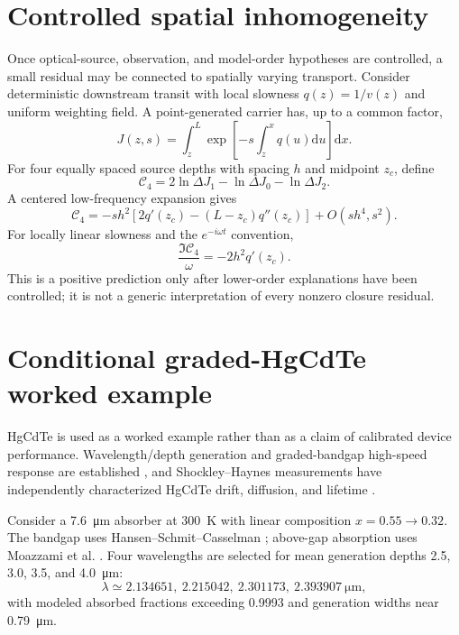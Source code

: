 \documentclass[11pt]{article}
\newcommand{\dd}{\mathrm{d}}
\newcommand{\Cfour}{\mathcal{C}_4}
\begin{document}
\section{Controlled spatial inhomogeneity}
Once optical-source, observation, and model-order hypotheses are controlled, a small residual may be connected to spatially varying transport. Consider deterministic downstream transit with local slowness $q(z)=1/v(z)$ and uniform weighting field. A point-generated carrier has, up to a common factor,
\begin{equation}
J(z,s)=\int_z^L\exp\left[-s\int_z^xq(u)\dd u\right]\dd x.
\end{equation}
For four equally spaced source depths with spacing $h$ and midpoint $z_c$, define
\begin{equation}
\Cfour=2\ln\Delta J_1-\ln\Delta J_0-\ln\Delta J_2.
\end{equation}
A centered low-frequency expansion gives
\begin{equation}
\boxed{\Cfour=-s h^2\left[2q'(z_c)-(L-z_c)q''(z_c)\right]+O(sh^4,s^2).}
\label{eq:gradient}
\end{equation}
For locally linear slowness and the $e^{-i\omega t}$ convention,
\begin{equation}
\boxed{\frac{\Im\Cfour}{\omega}=-2h^2q'(z_c).}
\end{equation}
This is a positive prediction only after lower-order explanations have been controlled; it is not a generic interpretation of every nonzero closure residual.

\section{Conditional graded-HgCdTe worked example}
HgCdTe is used as a worked example rather than as a claim of calibrated device performance. Wavelength/depth generation and graded-bandgap high-speed response are established \cite{Sang2022}, and Shockley--Haynes measurements have independently characterized HgCdTe drift, diffusion, and lifetime \cite{Rothman2010}.

Consider a \SI{7.6}{\micro\meter} absorber at \SI{300}{K} with linear composition $x=0.55\rightarrow0.32$. The bandgap uses Hansen--Schmit--Casselman \cite{Hansen1982}; above-gap absorption uses Moazzami et al. \cite{Moazzami2005}. Four wavelengths are selected for mean generation depths 2.5, 3.0, 3.5, and \SI{4.0}{\micro\meter}:
\begin{equation}
\lambda\simeq2.134651,\ 2.215042,\ 2.301173,\ 2.393907\ \si{\micro\meter},
\end{equation}
with modeled absorbed fractions exceeding 0.9993 and generation widths near \SI{0.79}{\micro\meter}.
\end{document}
